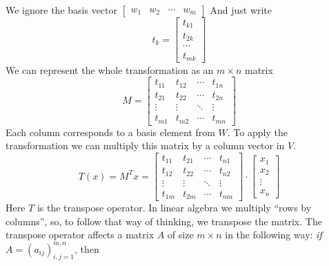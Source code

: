 \documentclass[../linear-spaces.tex]{subfiles}
\begin{document}
We ignore the basis vector
$\left[
        \begin{matrix}
            w_1 & w_2 & \cdots & w_m
        \end{matrix}
        \right]$
And just write
\begin{equation}
    t_k=\left[
        \begin{matrix}
            t_{k1} \\ t_{2k} \\ \cdots \\ t_{mk}
        \end{matrix}
        \right]
\end{equation}
We can represent the whole transformation as an $m\times n$ matrix
\begin{equation}
    M=\left[
        \begin{matrix}
            t_{11} & t_{12} & \cdots & t_{1n} \\
            t_{21} & t_{22} & \cdots & t_{2n} \\
            \vdots & \vdots & \ddots & \vdots \\
            t_{m1} & t_{m2} & \cdots & t_{mn}
        \end{matrix}
        \right]
\end{equation}
Each column corresponds to a basis element from $W$. To apply the transformation
we can multiply this matrix by a column vector in $V$.
\begin{equation}
    T(x) = M^{T}x = \left[
        \begin{matrix}
            t_{11} & t_{21} & \cdots & t_{n1} \\
            t_{12} & t_{22} & \cdots & t_{n2} \\
            \vdots & \vdots & \ddots & \vdots \\
            t_{1m} & t_{2m} & \cdots & t_{nm}
        \end{matrix}
        \right]\cdot \left[\begin{matrix}
            x_1 \\ x_2 \\ \vdots \\x_n
        \end{matrix}\right]
\end{equation}
Here $T$ is the transpose operator. In linear algebra we multiply ``rows by columns'',
so, to follow that way of thinking, we transpose the matrix. The transpose operator affects
a matrix $A$ of size $m\times n$ in the following way: \textit{if $A=\left(a_{ij}\right)^{m,n}_{i,j=1}$},
then
\end{document}
